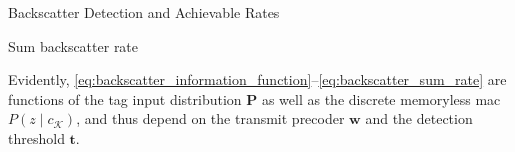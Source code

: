 \documentclass[journal]{IEEEtran}
\begin{document}
\begin{section}{Backscatter Detection and Achievable Rates}
\begin{subsection}{Sum backscatter rate}
\begin{subequations}
				\label{eq:backscatter_sum_rate}
			\end{subequations}

			Evidently, \eqref{eq:backscatter_information_function}--\eqref{eq:backscatter_sum_rate} are functions of the tag input distribution $\boldsymbol{P}$ as well as the discrete memoryless \gls{mac} $P(z \mid c_{\mathcal{K}})$, and thus depend on the transmit precoder $\boldsymbol{w}$ and the detection threshold $\boldsymbol{t}$.
		\end{subsection}


\end{section}
\end{document}
